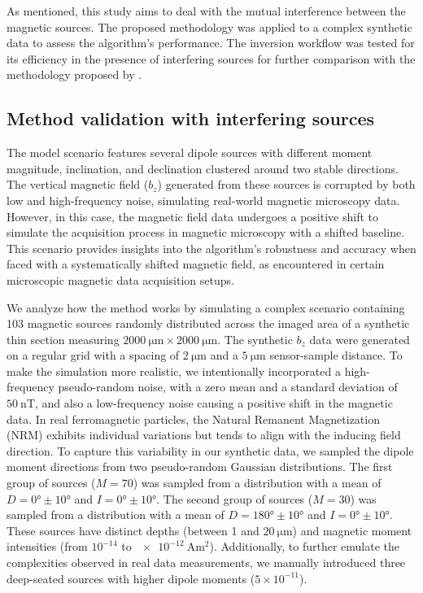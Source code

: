 As mentioned, this study aims to deal with the mutual interference between the magnetic sources. The proposed methodology was applied to a complex synthetic data to assess the algorithm's performance. The inversion workflow was tested for its efficiency in the presence of interfering sources for further comparison with the methodology proposed by  \citet{Souza-Junior2023b}.

\subsection{Method validation with interfering sources}

The model scenario features several dipole sources with different moment magnitude, inclination, and declination clustered around two stable directions. The vertical magnetic field ($b_z$) generated from these sources is corrupted by both low and high-frequency noise, simulating real-world magnetic microscopy data. However, in this case, the magnetic field data undergoes a positive shift to simulate the acquisition process in magnetic microscopy with a shifted baseline. This scenario provides insights into the algorithm's robustness and accuracy when faced with a systematically shifted magnetic field, as encountered in certain microscopic magnetic data acquisition setups.

We analyze how the method works by simulating a complex scenario containing 103 magnetic sources randomly distributed across the imaged area of a synthetic thin section measuring $\qty{2000}{\um} \times \qty{2000}{\um}$. The synthetic $b_z$ data were generated on a regular grid with a spacing of $\qty{2}{\um}$ and a $\qty{5}{\um}$ sensor-sample distance. To make the simulation more realistic, we intentionally incorporated a high-frequency pseudo-random noise, with a zero mean and a standard deviation of $\qty{50}{\nano\tesla}$, and also a low-frequency noise causing a positive shift in the magnetic data. In real ferromagnetic particles, the Natural Remanent Magnetization (NRM) exhibits individual variations but tends to align with the inducing field direction. To capture this variability in our synthetic data, we sampled the dipole moment directions from two pseudo-random Gaussian distributions. The first group of sources ($M = 70$) was sampled from a distribution with a mean of $D = \ang{0}\pm\ang{10}$ and $I = \ang{0}\pm\ang{10}$. The second group of sources ($M = 30$) was sampled from a distribution with a mean of $D = \ang{180}\pm\ang{10}$ and $I = \ang{0}\pm\ang{10}$. These sources have distinct depths (between 1 and $\qty{20}{\um}$) and magnetic moment intensities (from $10^{-14}$ to $\qty{e-12}{\ampere\m\squared}$). Additionally, to further emulate the complexities observed in real data measurements, we manually introduced three deep-seated sources with higher dipole moments ($5 \times 10^{-11}$). 

